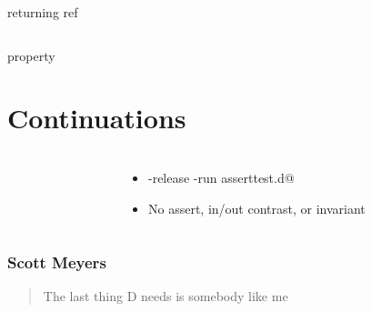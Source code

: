 \documentclass[aspectratio=169,notes]{beamer}
\begin{document}
	\begin{frame}[fragile]{returning ref}
		\begin{columns}[T]
		\begin{column}{0.49\textwidth}
		
		\end{column}
		\pause
		\begin{column}{0.49\textwidth}
		
		\end{column}
		\end{columns}
	\end{frame}

	\begin{frame}[fragile]{property}
		
	\end{frame}

	\section{Continuations}

	\begin{frame}[t]
		\frametitle{\lstinline@assert@s}
		\begin{columns}[T]
		\begin{column}{0.49\textwidth}
		
		\end{column}
		\begin{column}{0.49\textwidth}
		
		\begin{itemize}
			\item \lstinline@dmd -release -run asserttest.d@
			\pause
			\item No assert, in/out contrast, or invariant
		\end{itemize}
		\end{column}
		\end{columns}
	\end{frame}

	\begin{frame}[t]
		\frametitle{Scott Meyers}
		\begin{quote}
		The last thing D needs is somebody like me
		\end{quote}
	\end{frame}
\end{document}
